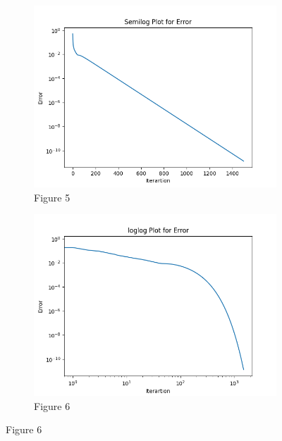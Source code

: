 \documentclass[12pt, a4paper]{report}
\begin{document}
\begin{figure}[h!]

\begin{subfigure}{0.55\textwidth}
    
    \includegraphics[scale=0.9,width=\linewidth]{fig2.png} 
    \caption{Figure 5}
    \label{fig:my_label}
\end{subfigure}
\begin{subfigure}{0.55\textwidth}
   
    \includegraphics[scale=0.9,width=\linewidth]{fig3.png} 
    \caption{Figure 6}
    \label{fig:image2}
\end{subfigure}
\end{figure}
\end{document}
